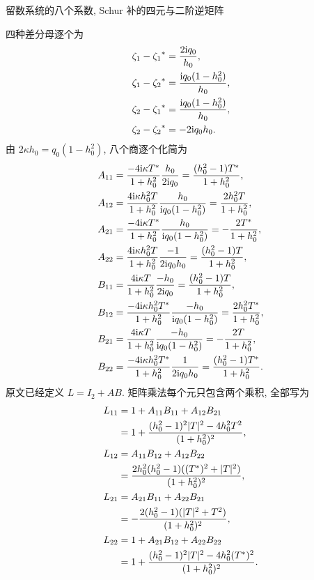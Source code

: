\par\medskip\noindent 留数系统的八个系数, Schur 补的四元与二阶逆矩阵\par
四种差分母逐个为
\begin{equation*}
\begin{aligned}
\zeta_1-{\zeta_1}^{*}&=\dfrac{2\mathrm{i} q_0}{h_0},\\
\zeta_1-{\zeta_2}^{*}&=\dfrac{\mathrm{i} q_0(1-h_0^2)}{h_0},\\
\zeta_2-{\zeta_1}^{*}&=\dfrac{\mathrm{i} q_0(1-h_0^2)}{h_0},\\
\zeta_2-{\zeta_2}^{*}&=-2\mathrm{i} q_0h_0.
\end{aligned}
\end{equation*}
由 $2\kappa h_0=q_0(1-h_0^2)$, 八个商逐个化简为
\begin{equation*}
\begin{aligned}
 A_{11}
&=\dfrac{-4\mathrm{i}\kappa{T}^{*}}{1+h_0^2}
\dfrac{h_0}{2\mathrm{i} q_0}
=\dfrac{(h_0^2-1){T}^{*}}{1+h_0^2},\\
 A_{12}
&=\dfrac{4\mathrm{i}\kappa h_0^2T}{1+h_0^2}
\dfrac{h_0}{\mathrm{i} q_0(1-h_0^2)}
=\dfrac{2h_0^2T}{1+h_0^2},\\
 A_{21}
&=\dfrac{-4\mathrm{i}\kappa{T}^{*}}{1+h_0^2}
\dfrac{h_0}{\mathrm{i} q_0(1-h_0^2)}
=-\dfrac{2{T}^{*}}{1+h_0^2},\\
 A_{22}
&=\dfrac{4\mathrm{i}\kappa h_0^2T}{1+h_0^2}
\dfrac{-1}{2\mathrm{i} q_0h_0}
=\dfrac{(h_0^2-1)T}{1+h_0^2},\\
 B_{11}
&=\dfrac{4\mathrm{i}\kappa T}{1+h_0^2}
\dfrac{-h_0}{2\mathrm{i} q_0}
=\dfrac{(h_0^2-1)T}{1+h_0^2},\\
 B_{12}
&=\dfrac{-4\mathrm{i}\kappa h_0^2{T}^{*}}{1+h_0^2}
\dfrac{-h_0}{\mathrm{i} q_0(1-h_0^2)}
=\dfrac{2h_0^2{T}^{*}}{1+h_0^2},\\
 B_{21}
&=\dfrac{4\mathrm{i}\kappa T}{1+h_0^2}
\dfrac{-h_0}{\mathrm{i} q_0(1-h_0^2)}
=-\dfrac{2T}{1+h_0^2},\\
 B_{22}
&=\dfrac{-4\mathrm{i}\kappa h_0^2{T}^{*}}{1+h_0^2}
\dfrac{1}{2\mathrm{i} q_0h_0}
=\dfrac{(h_0^2-1){T}^{*}}{1+h_0^2}.
\end{aligned}
\end{equation*}
原文已经定义 $L=I_2+ A B$.
矩阵乘法每个元只包含两个乘积, 全部写为
\begin{equation*}
\begin{aligned}
L_{11}
&=1+ A_{11} B_{11}
+ A_{12} B_{21}\\
&=1+\dfrac{(h_0^2-1)^2|T|^2-4h_0^2T^2}
{(1+h_0^2)^2},\\
L_{12}
&= A_{11} B_{12}
+ A_{12} B_{22}\\
&=\dfrac{2h_0^2(h_0^2-1)(({T}^{*})^2+|T|^2)}
{(1+h_0^2)^2},\\
L_{21}
&= A_{21} B_{11}
+ A_{22} B_{21}\\
&=-\dfrac{2(h_0^2-1)(|T|^2+T^2)}
{(1+h_0^2)^2},\\
L_{22}
&=1+ A_{21} B_{12}
+ A_{22} B_{22}\\
&=1+\dfrac{(h_0^2-1)^2|T|^2-4h_0^2({T}^{*})^2}
{(1+h_0^2)^2}.
\end{aligned}
\end{equation*}

